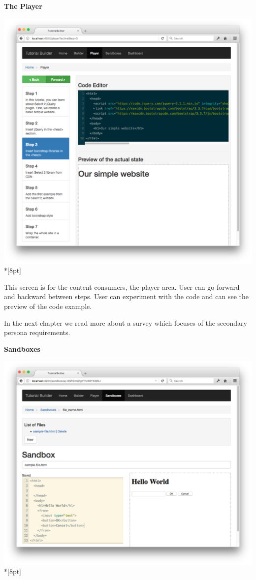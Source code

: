 \documentclass[11pt, a4paper, oneside, openright, medskipamount]{report}
\begin{document}
\newpage

\textbf{The Player}

\includegraphics[width=1\textwidth]{assets/tour-screenshots/the-player.png}\\*[8pt]

This screen is for the content consumers, the player area. User can go forward and backward between steps. User can experiment with the code and can see the preview of the code example.

In the next chapter we read more about a survey which focuses of the secondary persona requirements.

\newpage

\textbf{Sandboxes}

\includegraphics[width=1\textwidth]{assets/tour-screenshots/the-sandbox.png}\\*[8pt]
\end{document}
